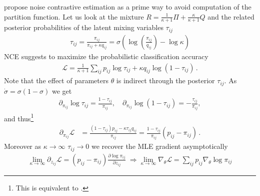 \documentclass{article}
\newcommand{\logl}{{\mathcal L}}
\begin{document}
\cite{mnih2012fast,mnih2013learning} propose noise contrastive estimation \cite{gutmann2012noise} as a prime way to avoid computation of the partition function. Let us look at the mixture $R = \frac{1}{\kappa+1} \Pi + \frac{\kappa}{\kappa+1} Q$ and the related posterior probabilities of the latent mixing variables $\tau_{ij}$
\begin{align}
\tau_{ij} = \frac{ \pi_{ij}}{\pi_{ij} + \kappa q_{ij}} 
= \sigma\left(  \log \left( \frac{\pi_{ij}}{ q_{ij}} \right) - \log \kappa\right)
\end{align}
NCE suggests to maximize the probabilistic classification accuracy
\begin{align}
\logl = \frac{1}{\kappa+1} \sum_{ij} p_{ij} \log \tau_{ij} + \kappa q_{ij} \log (1-\tau_{ij})\,.
\label{eq:nce}
\end{align}
Note that the effect of parameters $\theta$ is indirect through the posterior $\tau_{ij}$. As $\dot\sigma = \sigma (1-\sigma)$ we get
\begin{align}
\partial_{\pi_{ij}} \log \tau_{ij} = \frac{1-\tau_{ij}}{\pi_{ij}}, \quad 
\partial_{\pi_{ij}} \log (1-\tau_{ij}) = -\frac{\tau_{ij}}{\pi_{ij}},
\end{align}
and thus\footnote{This is equivalent to \cite[Eq.~10 \& 11]{mnih2013learning}.}
\begin{align}
\partial_{\pi_{ij}}  \logl 
& = 
\frac{(1-\tau_{ij}) p_{ij} - \kappa \tau_{ij} q_{ij}}{\pi_{ij}}
 = \frac{1-\tau_{ij}}{\pi_{ij}} \left(  p_{ij} -\pi_{ij}\right)\,.
\end{align}
Moreover  as $\kappa \to \infty$ $\tau_{ij} \to 0$ we recover the MLE gradient asymptotically
\begin{align}
\lim_{\kappa \to \infty}\partial_{z_{ij}}\logl  = (p_{ij} -\pi_{ij}) \frac{\partial \log \pi_{ij}}{\partial z_{ij}} \; \Longrightarrow \lim_{\kappa \to \infty} \nabla_\theta \logl 
= \sum_{ij} p_{ij} \nabla_\theta \log \pi_{ij}
\end{align}
\end{document}
